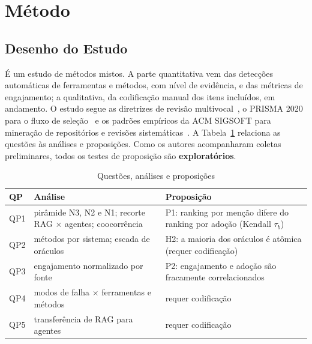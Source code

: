 \documentclass[sigconf]{acmart}
\begin{document}
\section{Método}
\label{sec:metodo}

\subsection{Desenho do Estudo}

É um estudo de métodos mistos. A parte quantitativa vem das detecções automáticas de ferramentas e métodos, com nível de evidência, e das métricas de engajamento; a qualitativa, da codificação manual dos itens incluídos, em andamento. O estudo segue as diretrizes de revisão multivocal~\cite{garousi2019guidelines}, o PRISMA 2020 para o fluxo de seleção~\cite{page2021prisma} e os padrões empíricos da ACM SIGSOFT para mineração de repositórios e revisões sistemáticas~\cite{ralph2020standards}. A Tabela~\ref{tab:qps} relaciona as questões às análises e proposições. Como os autores acompanharam coletas preliminares, todos os testes de proposição são \textbf{exploratórios}.

\begin{table}[t]
  \caption{Questões, análises e proposições}
  \label{tab:qps}
  \small
  \begin{tabular}{@{}>{\raggedright\arraybackslash}p{}>{\raggedright\arraybackslash}p{}>{\raggedright\arraybackslash}p{}@{}}
    \toprule
    QP & Análise & Proposição \\
    \midrule
    QP1 & pirâmide N3, N2 e N1; recorte RAG $\times$ agentes; coocorrência & P1: ranking por menção difere do ranking por adoção (Kendall $\tau_b$) \\
    QP2 & métodos por sistema; escada de oráculos & H2: a maioria dos oráculos é atômica (requer codificação) \\
    QP3 & engajamento normalizado por fonte & P2: engajamento e adoção são fracamente correlacionados \\
    QP4 & modos de falha $\times$ ferramentas e métodos & requer codificação \\
    QP5 & transferência de RAG para agentes & requer codificação \\
    \bottomrule
  \end{tabular}
\end{table}
\end{document}
